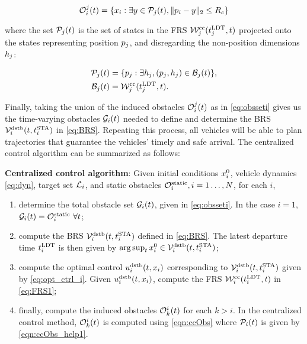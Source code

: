 \begin{equation} \label{eqn:ccObs}
\ioset_i^j(t) = \{\state_i: \exists y \in \pfrs_j(t), \|\pos_i - y\|_2 \le \rc \}
\end{equation}

\noindent where the set $\mathcal{P}_j(t)$ is the set of states in the FRS $\mathcal{W}_j^\text{cc}(t^\text{LDT}_j, t)$ projected onto the states representing position $p_j$, and disregarding the non-position dimensions $h_j$:

\begin{align} 
\pfrs_j(t) & = \{p_j: \exists \npos_j, (p_j, \npos_j) \in \boset_j(t) \}, \label{eqn:ccObs_help1}\\
\boset_j(t) & = \frs_j^\text{cc}(\ldt_j, t). \label{eqn:ccObs_help2}
\end{align}

Finally, taking the union of the induced obstacles $\mathcal{O}_i^j(t)$ as in \eqref{eq:obsseti} gives us the time-varying obstacles $\mathcal{G}_i(t)$ needed to define and determine the BRS $\mathcal{V}_i^\text{dstb}(t, t^\text{STA}_i)$ in \eqref{eq:BRS}. Repeating this process, all vehicles will be able to plan trajectories that guarantee the vehicles' timely and safe arrival. The centralized control algorithm can be summarized as follows:
\begin{alg}
\label{alg:cc}
\textbf{Centralized control algorithm}: Given initial conditions $x_i^0$, vehicle dynamics \eqref{eq:dyn}, target set $\mathcal{L}_i$, and static obstacles $\mathcal{O}^\text{static}_i, i = 1\ldots, N$, for each $i$,
\begin{enumerate}
\item determine the total obstacle set $\mathcal{G}_i(t)$, given in \eqref{eq:obsseti}. In the case $i=1$, $\mathcal{G}_i(t) = \mathcal{O}^\text{static}_i ~ \forall t$;
\item compute the BRS $\mathcal{V}_i^\text{dstb}(t, t^\text{STA}_i)$ defined in \eqref{eq:BRS}. The latest departure time $t^\text{LDT}_i$ is then given by $\arg \sup_t x^0_i \in \mathcal{V}_i^\text{dstb}(t, t^\text{STA}_i)$;
\item compute the optimal control $u_i^\text{dstb}(t,x_i)$ corresponding to $\mathcal{V}_i^\text{dstb}(t, t^\text{STA}_i)$ given by \eqref{eq:opt_ctrl_i}. Given $u_i^\text{dstb}(t,x_i)$, compute the FRS $\mathcal{W}_i^\text{cc}(t^\text{LDT}_i, t)$ in \eqref{eq:FRS1};
\item finally, compute the induced obstacles $\mathcal{O}_k^i(t)$ for each $k>i$. In the centralized control method, $\mathcal{O}_k^i(t)$ is computed using \eqref{eqn:ccObs} where $\mathcal{P}_i(t)$ is given by \eqref{eqn:ccObs_help1}.
\end{enumerate}
\end{alg}